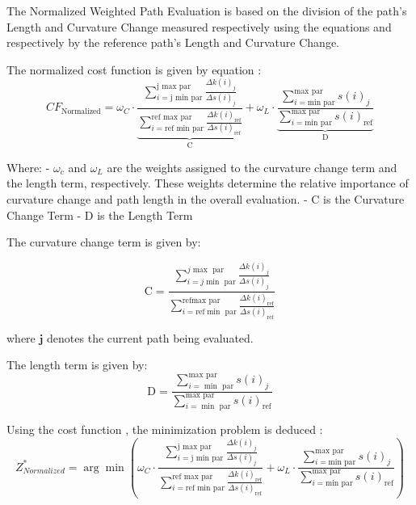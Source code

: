 The Normalized Weighted Path Evaluation is based on the division of the path's Length
and Curvature Change measured respectively using the equations  and 
 respectively by the reference path's Length and Curvature Change. 

\noindent The normalized cost function is given by equation :
\begin{equation}
    CF_{\text{Normalized}} = \omega_{C} \cdot \underbrace{\frac{\sum_{i=\text{j min par}}^{\text{j max par}} 
    \frac{\Delta k(i)_j}{\Delta s(i)_j}}{\sum_{i=\text{ref min par}}^{\text{ref max par}} 
    \frac{\Delta k(i)_{\text{ref}}}{\Delta s(i)_{\text{ref}}}}}_{\text{C}} 
    + \omega_{L} \cdot \underbrace{\frac{\sum_{i=\text{min par}}^{\text{max par}} s(i)_j}
    {\sum_{i=\text{min par}}^{\text{max par}} s(i)_{\text{ref}}}}_{\text{D}}
    \label{Norm_function}
\end{equation}

Where:
- \(\omega_c\) and \(\omega_L\) are the weights assigned to the curvature change term and the length term, 
    respectively. These weights determine the relative importance of curvature change and path length in the overall 
    evaluation. 
\newline - C is the Curvature Change Term
\newline - D is the Length Term

\noindent
The curvature change term is given by:

\begin{equation}
    \text{C} = \frac{\sum_{i=j \min \text{ par}}^{j \max \text{ par}} \frac{\Delta k(i)_j}{\Delta s(i)_j}}{\sum_{i=\text{ref} \min \text{ par}}^{\text{ref} \max \text{ par}} \frac{\Delta k(i)_{\text{ref}}}{\Delta s(i)_{\text{ref}}}}
\end{equation}

where \( \mathbf{j} \) denotes the current path being evaluated.


The length term is given by:
\begin{equation}
    \text{D} = \frac{\sum_{i=\min \text{ par}}^{\max \text{ par}} s(i)_j}{\sum_{i=\min \text{ par}}^{\max \text{ par}} s(i)_{\text{ref}}}
\end{equation}


\noindent Using the cost function , the minimization problem is deduced :
\begin{equation}
    Z_{Normalized}^{\ast} = \arg \min \left( \omega_C \cdot \frac{\sum_{i=\text{j min par}}^{\text{j max par}} \frac{\Delta k(i)_j}
    {\Delta s(i)_j}}{\sum_{i=\text{ref min par}}^{\text{ref max par}} \frac{\Delta k(i)_{\text{ref}}}
    {\Delta s(i)_{\text{ref}}} } + \omega_L \cdot \frac{\sum_{i=\text{min par}}^{\text{max par}} s(i)_j}
    {\sum_{i=\text{min par}}^{\text{max par}} s(i)_{\text{ref}}} \right)
\end{equation}

